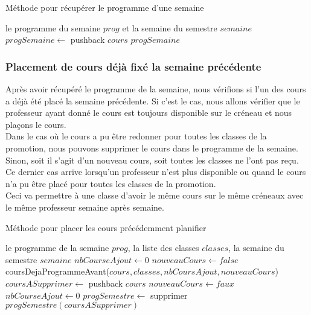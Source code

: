 \begin{algorithm}
\caption{Méthode pour récupérer le programme d'une semaine}
\begin{algorithmic}
\REQUIRE le programme du semaine $prog$ et la semaine du semestre $semaine$
\STATE $progSemaine \leftarrow$ pushback $cours$
\ENDIF
\ENDFOR
\RETURN $progSemaine$
\end{algorithmic}
\end{algorithm}

\subsubsection{Placement de cours déjà fixé la semaine précédente}

Après avoir récupéré le programme de la semaine, nous vérifions si l'un des cours a déjà été placé la semaine précédente. Si c'est le cas, nous allons vérifier que le professeur ayant donné le cours est toujours disponible sur le créneau et nous plaçons le cours.\\

Dans le cas où le cours a pu être redonner pour toutes les classes de la promotion, nous pouvons supprimer le cours dans le programme de la semaine. Sinon, soit il s'agit d'un nouveau cours, soit toutes les classes ne l'ont pas reçu. Ce dernier cas arrive lorsqu'un professeur n'est plus disponible ou quand le cours n'a pu être placé pour toutes les classes de la promotion.\\

Ceci va permettre à une classe d'avoir le même cours sur le même créneaux avec le même professeur semaine après semaine.

\begin{algorithm}
\caption{Méthode pour placer les cours précédemment planifier}
\begin{algorithmic}
\REQUIRE le programme de la semaine $prog$, la liste des classes $classes$, la semaine du semestre $semaine$
\STATE $nbCourseAjout \leftarrow 0$
\STATE $nouveauCours \leftarrow false$
\STATE coursDejaProgrammeAvant($cours, classes, nbCoursAjout, nouveauCours$)
\STATE $coursASupprimer \leftarrow$ pushback $cours$
\ELSE 
\STATE $nouveauCours \leftarrow faux$
\ENDIF
\STATE $nbCourseAjout \leftarrow 0$
\ENDFOR
{}
\STATE $progSemestre \leftarrow$ supprimer $progSemestre(coursASupprimer)$
\ENDFOR
\ENDIF
\end{algorithmic}
\end{algorithm}


